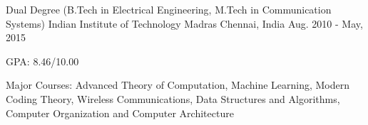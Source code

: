 \begin{cventries}
	\cventry
	{Dual Degree (B.Tech in Electrical Engineering, M.Tech in Communication Systems)}
	{Indian Institute of Technology Madras}
	{Chennai, India}
	{Aug. 2010 - May, 2015}
	{
		\begin{cvitems}
		\item{GPA: 8.46/10.00}
		\item{Major Courses: Advanced Theory of Computation, Machine Learning, Modern Coding Theory, Wireless Communications, Data Structures and Algorithms, Computer Organization and Computer Architecture}
		\end{cvitems}
	}

\end{cventries}
